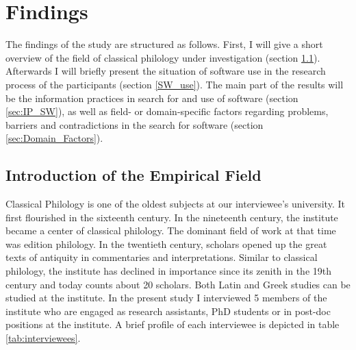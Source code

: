 \documentclass[12pt, a4paper, titlepage, oneside, abstract=true, toc=listof, toc=bibliography]{scrreprt}
\begin{document}
	
\chapter{Findings}
The findings of the study are structured as follows. First, I will give a short overview of the field of classical philology under investigation (section \ref{sec:introduction_field}). Afterwards I will briefly present the situation of software use in the research process of the participants (section \ref{SW_use}). The main part of the results will be the information practices in search for and use of software (section \ref{sec:IP_SW}), as well as field- or domain-specific factors regarding problems, barriers and contradictions in the search for software (section \ref{sec:Domain_Factors}).

\section{Introduction of the Empirical Field}
\label{sec:introduction_field}
Classical Philology is one of the oldest subjects at our interviewee's university. It first flourished in the sixteenth century. In the nineteenth century, the institute became a center of classical philology. The dominant field of work at that time was edition philology. In the twentieth century, scholars opened up the great texts of antiquity in commentaries and interpretations. Similar to classical philology, the institute has declined in importance since its zenith in the 19th century and today counts about 20 scholars. Both Latin and Greek studies can be studied at the institute.
In the present study I interviewed 5 members of the institute who are engaged as research assistants, PhD students or in post-doc positions at the institute. A brief profile of each interviewee is depicted in table \ref{tab:interviewees}. 
\end{document}
